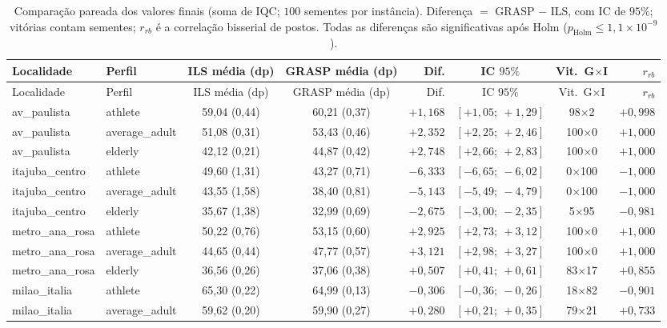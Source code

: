 \documentclass[11pt,a4paper]{article}
\begin{document}
\renewcommand{\arraystretch}{1.15}
\begin{longtable}{@{}l l c c r c c r@{}}
\caption{Comparação pareada dos valores finais (soma de IQC; $100$ sementes por instância). Diferença $= $ GRASP $-$ ILS, com IC de $95\%$; vitórias contam sementes; $r_{rb}$ é a correlação bisserial de postos. Todas as diferenças são significativas após Holm ($p_{\text{Holm}} \le 1{,}1\times10^{-9}$).}\label{tab:comp-final}\\
\toprule
Localidade & Perfil & ILS média (dp) & GRASP média (dp) & Dif. & IC $95\%$ & Vit.\ G$\times$I & $r_{rb}$ \\
\midrule
\endfirsthead
\toprule
Localidade & Perfil & ILS média (dp) & GRASP média (dp) & Dif. & IC $95\%$ & Vit.\ G$\times$I & $r_{rb}$ \\
\midrule
\endhead
av\_paulista & athlete & 59,04 (0,44) & 60,21 (0,37) & $+1{,}168$ & $[+1{,}05;\ +1{,}29]$ & 98$\times$2 & $+0{,}998$ \\
av\_paulista & average\_adult & 51,08 (0,31) & 53,43 (0,46) & $+2{,}352$ & $[+2{,}25;\ +2{,}46]$ & 100$\times$0 & $+1{,}000$ \\
av\_paulista & elderly & 42,12 (0,21) & 44,87 (0,42) & $+2{,}748$ & $[+2{,}66;\ +2{,}83]$ & 100$\times$0 & $+1{,}000$ \\
itajuba\_centro & athlete & 49,60 (1,31) & 43,27 (0,71) & $-6{,}333$ & $[-6{,}65;\ -6{,}02]$ & 0$\times$100 & $-1{,}000$ \\
itajuba\_centro & average\_adult & 43,55 (1,58) & 38,40 (0,81) & $-5{,}143$ & $[-5{,}49;\ -4{,}79]$ & 0$\times$100 & $-1{,}000$ \\
itajuba\_centro & elderly & 35,67 (1,38) & 32,99 (0,69) & $-2{,}675$ & $[-3{,}00;\ -2{,}35]$ & 5$\times$95 & $-0{,}981$ \\
metro\_ana\_rosa & athlete & 50,22 (0,76) & 53,15 (0,60) & $+2{,}925$ & $[+2{,}73;\ +3{,}12]$ & 100$\times$0 & $+1{,}000$ \\
metro\_ana\_rosa & average\_adult & 44,65 (0,44) & 47,77 (0,57) & $+3{,}121$ & $[+2{,}98;\ +3{,}27]$ & 100$\times$0 & $+1{,}000$ \\
metro\_ana\_rosa & elderly & 36,56 (0,26) & 37,06 (0,38) & $+0{,}507$ & $[+0{,}41;\ +0{,}61]$ & 83$\times$17 & $+0{,}855$ \\
milao\_italia & athlete & 65,30 (0,22) & 64,99 (0,13) & $-0{,}306$ & $[-0{,}36;\ -0{,}26]$ & 18$\times$82 & $-0{,}901$ \\
milao\_italia & average\_adult & 59,62 (0,20) & 59,90 (0,27) & $+0{,}280$ & $[+0{,}21;\ +0{,}35]$ & 79$\times$21 & $+0{,}733$ \\

\end{longtable}
\end{document}
